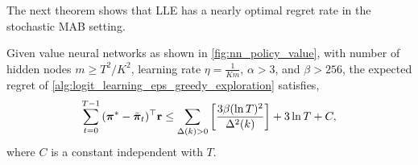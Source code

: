 The next theorem shows that LLE has a nearly optimal regret rate in the stochastic MAB setting.
\begin{thm}
\label{thm:logit_learning_main_result}
    Given value neural networks as shown in \cref{fig:nn_policy_value}, with number of hidden nodes $m \ge T^2 / K^2$, learning rate $\eta = \frac{1}{K m}$,  $\alpha > 3$, and $\beta > 256$, the expected regret of \cref{alg:logit_learning_eps_greedy_exploration} satisfies,
\begin{equation*}
\begin{split}
    \sum\limits_{t=0}^{T-1}{ ( {{\boldsymbol{\pi}}^*} - \tilde{{\boldsymbol{\pi}}}_t)^\top {\mathbf{r}} } \le \sum\limits_{\Delta(k) > 0}{ \left[ \frac{ 3 \beta ( \ln{T} )^2}{\Delta^2(k)} \right] }  + 3 \ln{T} + C,
\end{split}
\end{equation*}
where $C$ is a constant independent with $T$.
\end{thm}
